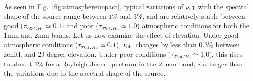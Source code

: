 


As seen in Fig.~\ref{fig:atmosphereimpact}, typical variations of
$\nu_{\rm{eff}}$ with the spectral shape of the
source range between $1\%$ and $3\%$, and are relatively stable
between good ($\tau_{225GHz} \simeq 0.1$) and
poor  ($\tau_{225GHz} \simeq 1.0$) atmospheric conditions for both the
1mm and 2mm bands. Let us now examine the effect of elevation.
Under good atmospheric conditions ($\tau_{225GHz} \simeq 0.1$), $\nu_{\rm{eff}}$ changes by
less than 0.3\% between zenith and 20 degree elevation. Under poor
conditions ($\tau_{225GHz} \simeq 1.0$), this rises to almost 3\% for
a Rayleigh-Jeans spectrum in the 2~mm band, {\it i.e.} larger than the
variations due to the spectral shape of the source.



